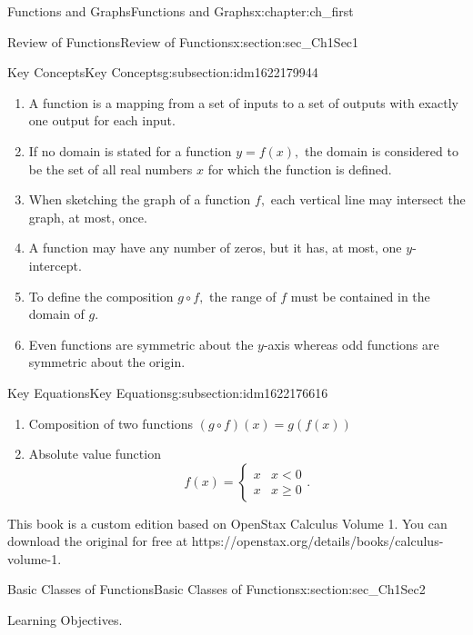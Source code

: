 \documentclass[oneside,10pt,]{book}
\numberwithin{equation}{section}
\newcommand{\lt}{<}
\newcommand{\amp}{&}
\begin{document}
\begin{chapterptx}{Functions and Graphs}{}{Functions and Graphs}{}{}{x:chapter:ch_first}
\begin{sectionptx}{Review of Functions}{}{Review of Functions}{}{}{x:section:sec_Ch1Sec1}
\begin{subsectionptx}{Key Concepts}{}{Key Concepts}{}{}{g:subsection:idm1622179944}
\begin{enumerate}
\item{}A function is a mapping from a set of inputs to a set of outputs with exactly one output for each input.%
\item{}If no domain is stated for a function \(y=f(x),\) the domain is considered to be the set of all real numbers \(x\) for which the function is defined.%
\item{}When sketching the graph of a function \(f,\) each vertical line may intersect the graph, at most, once.%
\item{}A function may have any number of zeros, but it has, at most, one \(y\)-intercept.%
\item{}To define the composition \(g\circ f,\) the range of \(f\) must be contained in the domain of \(g.\)%
\item{}Even functions are symmetric about the \(y\)-axis whereas odd functions are symmetric about the origin.%
\end{enumerate}
\end{subsectionptx}
%
%
\typeout{************************************************}
\typeout{************************************************}
%
\begin{subsectionptx}{Key Equations}{}{Key Equations}{}{}{g:subsection:idm1622176616}
%
\begin{enumerate}
\item{}Composition of two functions \((g\circ f)(x)=g(f(x))\)%
\item{}Absolute value function%
\begin{equation*}
f(x)=\begin{cases}x \amp x \lt 0 \\ x \amp x \geq 0\end{cases}\text{.}
\end{equation*}
%
\end{enumerate}
\end{subsectionptx}
This book is a custom edition based on OpenStax Calculus Volume 1. You can download the original for free at https:\slash{}\slash{}openstax.org\slash{}details\slash{}books\slash{}calculus-volume-1.%
\end{sectionptx}
%
%
\typeout{************************************************}
\typeout{************************************************}
%
\begin{sectionptx}{Basic Classes of Functions}{}{Basic Classes of Functions}{}{}{x:section:sec_Ch1Sec2}
\begin{introduction}{Learning Objectives.}%

\end{introduction}
\end{sectionptx}
\end{chapterptx}
\end{document}

